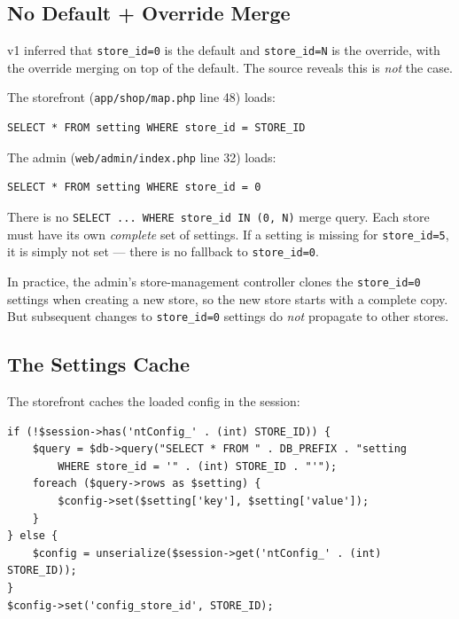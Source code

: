 \documentclass[11pt,a4paper]{article}
\begin{document}
\subsection{No Default + Override Merge}

\begin{findingbox}
v1 inferred that \texttt{store\_id=0} is the default and
\texttt{store\_id=N} is the override, with the override merging on top
of the default. The source reveals this is \emph{not} the case.

The storefront (\texttt{app/shop/map.php} line 48) loads:
\begin{lstlisting}[language={},basicstyle=\ttfamily\small,numbers=none,frame=none]
SELECT * FROM setting WHERE store_id = STORE_ID
\end{lstlisting}

The admin (\texttt{web/admin/index.php} line 32) loads:
\begin{lstlisting}[language={},basicstyle=\ttfamily\small,numbers=none,frame=none]
SELECT * FROM setting WHERE store_id = 0
\end{lstlisting}

There is no \texttt{SELECT ... WHERE store\_id IN (0, N)} merge query.
Each store must have its own \emph{complete} set of settings. If a
setting is missing for \texttt{store\_id=5}, it is simply not set ---
there is no fallback to \texttt{store\_id=0}.

In practice, the admin's store-management controller clones the
\texttt{store\_id=0} settings when creating a new store, so the new
store starts with a complete copy. But subsequent changes to
\texttt{store\_id=0} settings do \emph{not} propagate to other stores.
\end{findingbox}

\subsection{The Settings Cache}

The storefront caches the loaded config in the session:

\begin{lstlisting}[caption={Settings caching in \texttt{app/shop/map.php}.},label={lst:settings-cache}]
if (!$session->has('ntConfig_' . (int) STORE_ID)) {
    $query = $db->query("SELECT * FROM " . DB_PREFIX . "setting
        WHERE store_id = '" . (int) STORE_ID . "'");
    foreach ($query->rows as $setting) {
        $config->set($setting['key'], $setting['value']);
    }
} else {
    $config = unserialize($session->get('ntConfig_' . (int) STORE_ID));
}
$config->set('config_store_id', STORE_ID);
\end{lstlisting}
\end{document}
